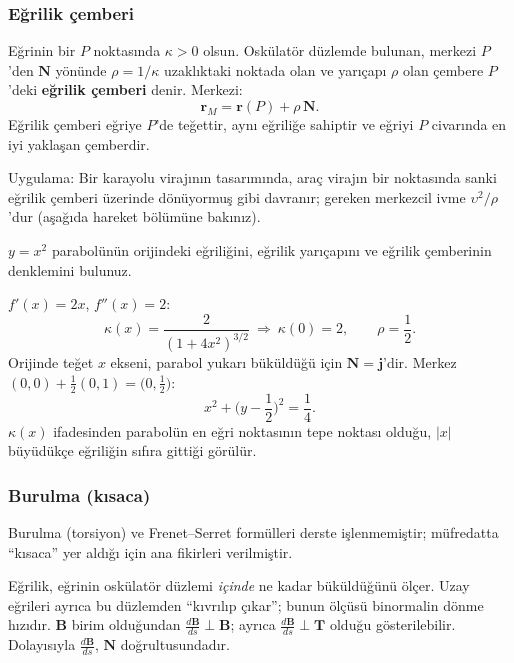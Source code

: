 \subsubsection{Eğrilik çemberi}

\begin{tanim}
Eğrinin bir $P$ noktasında $\kappa>0$ olsun. Oskülatör düzlemde bulunan, merkezi $P$'den $\mathbf N$ yönünde $\rho=1/\kappa$
uzaklıktaki noktada olan ve yarıçapı $\rho$ olan çembere $P$'deki \textbf{eğrilik çemberi} denir. Merkezi:
\[ \mathbf r_M=\mathbf r(P)+\rho\,\mathbf N . \]
Eğrilik çemberi eğriye $P$'de teğettir, aynı eğriliğe sahiptir ve eğriyi $P$ civarında en iyi yaklaşan çemberdir.
\end{tanim}

Uygulama: Bir karayolu virajının tasarımında, araç virajın bir noktasında sanki eğrilik çemberi üzerinde dönüyormuş gibi
davranır; gereken merkezcil ivme $\upsilon^2/\rho$'dur (aşağıda hareket bölümüne bakınız).

\begin{soru}
$y=x^2$ parabolünün orijindeki eğriliğini, eğrilik yarıçapını ve eğrilik çemberinin denklemini bulunuz.
\end{soru}
\begin{cevap}
$f'(x)=2x$, $f''(x)=2$:
\[ \kappa(x)=\frac{2}{(1+4x^2)^{3/2}}\ \Rightarrow\ \kappa(0)=2,\qquad \rho=\frac12 . \]
Orijinde teğet $x$ ekseni, parabol yukarı büküldüğü için $\mathbf N=\mathbf j$'dir. Merkez $(0,0)+\frac12(0,1)=\big(0,\frac12\big)$:
\[ x^2+\Big(y-\frac12\Big)^2=\frac14 . \]
$\kappa(x)$ ifadesinden parabolün en eğri noktasının tepe noktası olduğu, $|x|$ büyüdükçe eğriliğin sıfıra gittiği görülür.
\end{cevap}

\subsubsection{Burulma (kısaca)}

\begin{bilgi}
Burulma (torsiyon) ve Frenet--Serret formülleri derste işlenmemiştir; müfredatta ``kısaca'' yer aldığı için ana fikirleri verilmiştir.
\end{bilgi}

Eğrilik, eğrinin oskülatör düzlemi \emph{içinde} ne kadar büküldüğünü ölçer. Uzay eğrileri ayrıca bu düzlemden
``kıvrılıp çıkar''; bunun ölçüsü binormalin dönme hızıdır. $\mathbf B$ birim olduğundan $\frac{d\mathbf B}{ds}\perp\mathbf B$; ayrıca
$\frac{d\mathbf B}{ds}\perp\mathbf T$ olduğu gösterilebilir. Dolayısıyla $\frac{d\mathbf B}{ds}$, $\mathbf N$ doğrultusundadır.

